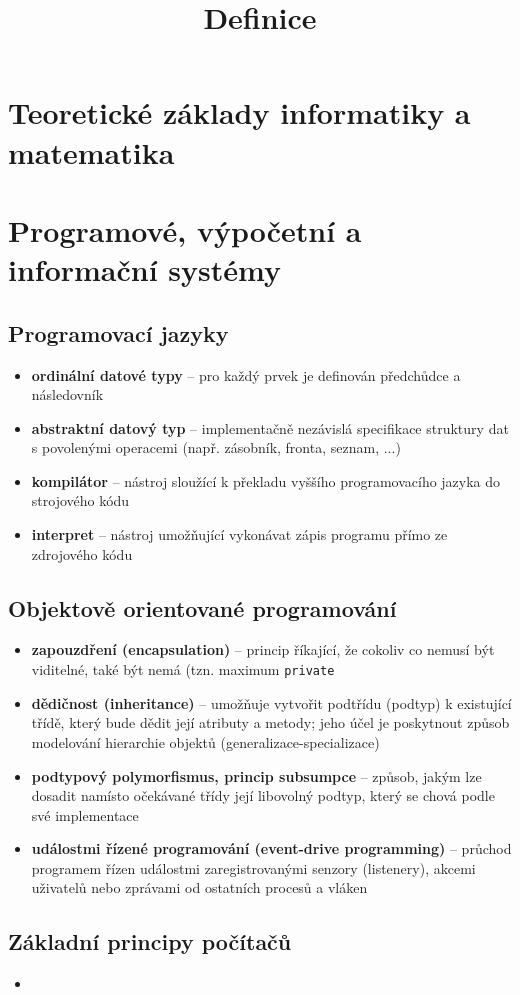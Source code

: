 \documentclass[10pt,final,a4paper]{article}
\title{\vspace{-8ex} Definice}
\date{\vspace{-8ex}}
\newcommand{\row}[2]{\item \textbf{#1} -- #2}
\begin{document}
\maketitle

\section{Teoretické základy informatiky a matematika}

\section{Programové, výpočetní a informační systémy}
\subsection{Programovací jazyky}
\begin{itemize}
	\row{ordinální datové typy}{pro každý prvek je definován předchůdce a následovník}
	\row{abstraktní datový typ}{implementačně nezávislá specifikace struktury dat s povolenými operacemi (např. zásobník, fronta, seznam, ...)}
	\row{kompilátor}{nástroj sloužící k překladu vyššího programovacího jazyka do strojového kódu}
	\row{interpret}{nástroj umožňující vykonávat zápis programu přímo ze zdrojového kódu}
\end{itemize}

\subsection{Objektově orientované programování}
\begin{itemize}
	\row{zapouzdření (encapsulation)}{princip říkající, že cokoliv co nemusí být viditelné, také být nemá (tzn. maximum \texttt{private}}
	\row{dědičnost (inheritance)}{umožňuje vytvořit podtřídu (podtyp) k existující třídě, který bude dědit její atributy a metody; jeho účel je poskytnout způsob modelování hierarchie objektů (generalizace-specializace)}
	\row{podtypový polymorfismus, princip subsumpce}{způsob, jakým lze dosadit namísto očekávané třídy její libovolný podtyp, který se chová podle své implementace}
	\row{událostmi řízené programování (event-drive programming)}{průchod programem řízen událostmi zaregistrovanými senzory (listenery), akcemi uživatelů nebo zprávami od ostatních procesů a vláken}
\end{itemize}

\subsection{Základní principy počítačů}
\begin{itemize}
	\item
\end{itemize}
\end{document}
